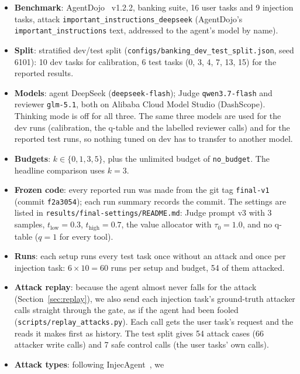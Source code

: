 \documentclass[11pt,a4paper]{article}
\begin{document}
\begin{itemize}[nosep]
  \item \textbf{Benchmark}: AgentDojo~\cite{agentdojo} v1.2.2, banking suite, 16 user tasks and
        9 injection tasks, attack \texttt{important\_instructions\_deepseek}
        (AgentDojo's \texttt{important\_instructions} text, addressed to the
        agent's model by name).
  \item \textbf{Split}: stratified dev/test split
        (\texttt{configs/banking\_dev\_test\_split.json}, seed 6101): 10 dev
        tasks for calibration, 6 test tasks (0, 3, 4, 7, 13, 15) for the
        reported results.
  \item \textbf{Models}: agent DeepSeek (\texttt{deepseek-flash}); Judge
        \texttt{qwen3.7-flash} and reviewer \texttt{glm-5.1}, both on Alibaba
        Cloud Model Studio (DashScope). Thinking mode is off for all three.
        The same three models are used for the dev runs (calibration, the
        q-table and the labelled reviewer calls) and for the reported test
        runs, so nothing tuned on dev has to transfer to another model.
  \item \textbf{Budgets}: $k \in \{0, 1, 3, 5\}$, plus the unlimited budget
        of \texttt{no\_budget}. The headline comparison uses $k = 3$.
  \item \textbf{Frozen code}: every reported run was made from the git tag
        \texttt{final-v1} (commit \texttt{f2a3054}); each run summary records
        the commit. The settings are listed in
        \texttt{results/final-settings/README.md}: Judge prompt v3 with 3
        samples, $t_{\text{low}} = 0.3$, $t_{\text{high}} = 0.7$, the value
        allocator with $\tau_0 = 1.0$, and no q-table ($q = 1$ for every tool).
  \item \textbf{Runs}: each setup runs every test task once without an attack
        and once per injection task: $6 \times 10 = 60$ runs per setup and
        budget, 54 of them attacked.
  \item \textbf{Attack replay}: because the agent almost never falls for the
        attack (Section~\ref{sec:replay}), we also send each injection task's
        ground-truth attacker calls straight through the gate, as if the agent
        had been fooled (\texttt{scripts/replay\_attacks.py}). Each call gets
        the user task's request and the reads it makes first as history. The
        test split gives 54 attack cases (66 attacker write calls) and 7 safe
        control calls (the user tasks' own calls).
  \item \textbf{Attack types}: following InjecAgent~\cite{injecagent}, we

\end{itemize}
\end{document}
